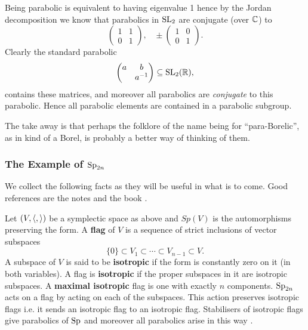 \begin{Remark}
    Being parabolic is equivalent to having eigenvalue 1 hence by the Jordan decomposition we know that parabolics in \(\operatorname{SL}_2\) are conjugate (over \(\C\)) to 
    \[\begin{pmatrix}
        1 & 1\\
        0 & 1
    \end{pmatrix},\;\;\; \pm\begin{pmatrix}
        1 & 0\\
        0 & 1
    \end{pmatrix}.\]
    Clearly the standard parabolic 
    \[\begin{pmatrix}
        a & b \\
         & a\inv
    \end{pmatrix} \subseteq \SL_2(\R),\]
    contains these matrices, and moreover all parabolics are \textit{conjugate} to this parabolic. Hence all parabolic elements are contained in a parabolic subgroup. 

    The take away is that perhaps the folklore of the name being for ``para-Borelic'', as in kind of a Borel, is probably a better way of thinking of them.
\end{Remark}

\subsubsection{The Example of \(\operatorname{Sp}_{2n}\)}
We collect the following facts as they will be useful in what is to come. Good references are the notes \cite{conradStandardParabolicSubgroups} and the book \cite[\S 8]{BuildingsClassicalGroups}. 

Let \((V, \langle ,\rangle)\) be a symplectic space as above and \(Sp(V)\) is the automorphisms preserving the form. A \textbf{flag} of \(V\) is a sequence of strict inclusions of vector subspaces 
\[\{0\}\subset V_1 \subset \cdots \subset V_{n-1} \subset V. \]
A subspace of \(V\) is said to be \textbf{isotropic} if the form is constantly zero on it (in both variables). A flag is \textbf{isotropic} if the proper subspaces in it are isotropic subspaces. A \textbf{maximal isotropic} flag is one with exactly \(n\) components. \(\operatorname{Sp}_{2n}\) acts on a flag by acting on each of the subspaces. This action preserves isotropic flags i.e. it sends an isotropic flag to an isotropic flag. Stabilisers of isotropic flags give parabolics of \(\operatorname{Sp}\) and moreover all parabolics arise in this way \cite[Exercise 3.2.16, 6.2.11]{springerLinearAlgebraicGroups1998}.

